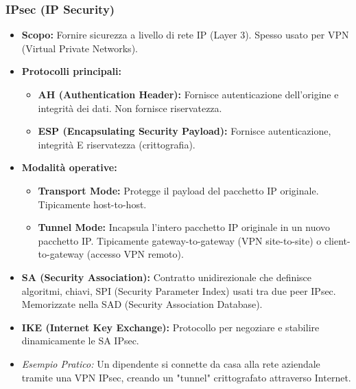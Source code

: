 \subsubsection{IPsec (IP Security)}
\begin{itemize}
    \item \textbf{Scopo:} Fornire sicurezza a livello di rete IP (Layer 3). Spesso usato per VPN (Virtual Private Networks).
    \item \textbf{Protocolli principali:}
    \begin{itemize}
        \item \textbf{AH (Authentication Header):} Fornisce autenticazione dell'origine e integrità dei dati. Non fornisce riservatezza.
        \item \textbf{ESP (Encapsulating Security Payload):} Fornisce autenticazione, integrità E riservatezza (crittografia).
    \end{itemize}
    \item \textbf{Modalità operative:}
    \begin{itemize}
        \item \textbf{Transport Mode:} Protegge il payload del pacchetto IP originale. Tipicamente host-to-host.
        \item \textbf{Tunnel Mode:} Incapsula l'intero pacchetto IP originale in un nuovo pacchetto IP. Tipicamente gateway-to-gateway (VPN site-to-site) o client-to-gateway (accesso VPN remoto).
    \end{itemize}
    \item \textbf{SA (Security Association):} Contratto unidirezionale che definisce algoritmi, chiavi, SPI (Security Parameter Index) usati tra due peer IPsec. Memorizzate nella SAD (Security Association Database).
    \item \textbf{IKE (Internet Key Exchange):} Protocollo per negoziare e stabilire dinamicamente le SA IPsec.
    \item \emph{Esempio Pratico:} Un dipendente si connette da casa alla rete aziendale tramite una VPN IPsec, creando un "tunnel" crittografato attraverso Internet.
\end{itemize}

